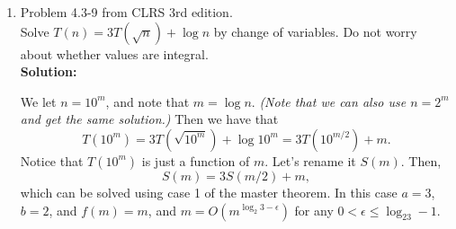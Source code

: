 \documentclass[letterpaper,11pt]{article}
\begin{document}
\begin{enumerate}
\begin{proof}
\vfill{}
\hfill{}See next page for finished proof $\rightarrow$

\begin{align*}
T(n) &= \Theta(n^{\log_b a}) + \sum_{i=0}^{\log_b n-1}a^if(n/b^i)\\
     &= \Theta(n^{\log_2 8}) + \sum_{i=0}^{\lg n-1}{8}^if(n/2^i)\\
     &= \Theta(n^3) + \sum_{i=0}^{\lg n-1}{8}^i\left(\frac{n}{2^i}\right)^3\lg(n/2^i)\\
     &= \Theta(n^3) + \sum_{i=0}^{\lg n-1}{8}^i\left(\frac{n^3}{8^i}\right)\lg(n/2^i)\\
     &= \Theta(n^3) + \sum_{i=0}^{\lg n-1}n^3\lg(n/2^i)&\text{(stop here for $T(n) = O(n^3\lg^2 n)$)}\\
     &= \Theta(n^3) + \sum_{i=0}^{\lg n-1}n^3(\lg n - \lg 2^i)\\
     &= \Theta(n^3) + \sum_{i=0}^{\lg n-1}n^3(\lg n - i\lg 2)\\
     &= \Theta(n^3) + \sum_{i=0}^{\lg n-1}(n^3\lg n - n^3i)\\
     &= \Theta(n^3) + \sum_{i=0}^{\lg n-1}n^3\lg n - \sum_{i=0}^{\lg n-1}n^3i\\
     &= \Theta(n^3) + n^3\lg n\sum_{i=0}^{\lg n-1}1 - n^3\sum_{i=0}^{\lg n-1}i\\
     &= \Theta(n^3) + n^3\lg n\lg n - n^3\frac{(\lg n-1)\lg n}{2}\\
     &= \Theta(n^3) + n^3\lg n\left(\lg n - \frac{1}{2}(\lg n - 1)\right)\\
     &= \Theta(n^3) + n^3\lg n\left(\frac{1}{2}\lg n + \frac{1}{2}\right)\\
     &= \Theta(n^3\lg^2 n).
\end{align*}
\end{proof}


\newpage

\item Problem 4.3-9 from CLRS 3rd edition.\\

Solve $T(n) = 3T(\sqrt{n}) +\log n$ by change of variables. Do not worry about whether values are integral.\\

\textbf{Solution:}

We let $n = 10^m$, and note that $m = \log n$. \emph{(Note that we can also use $n = 2^m$ and get the same solution.)} Then we have that
\[T(10^m) = 3T(\sqrt{10^{m}}) + \log 10^m = 3T(10^{m/2}) + m.\]
Notice that $T(10^m)$ is just a function of $m$. Let's rename it $S(m)$. Then,
\[S(m) = 3S(m/2) + m,\]
which can be solved using case 1 of the master theorem.
In this case $a=3$, $b=2$, and $f(m) = m$, and $m = O(m^{\log_2{3}-\epsilon})$ for any $0 < \epsilon \leq \log_23 - 1$.


\end{enumerate}
\end{document}
